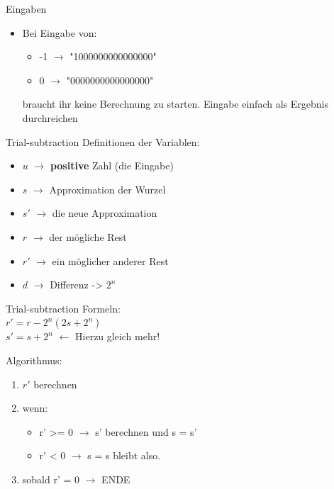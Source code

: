 \documentclass[aspectratio=169,presentation]{beamer}
\begin{document}
\begin{frame} {Eingaben}
	\begin{itemize}
		\item Bei Eingabe von:
		\begin{itemize}
			\item -1 $\rightarrow$ "1000000000000000"
			\item 0 $\rightarrow$ "0000000000000000"
		\end{itemize}
		braucht ihr keine Berechnung zu starten. Eingabe einfach als Ergebnis durchreichen
	\end{itemize}	
\end{frame}


\begin{frame} {Trial-subtraction}
	Definitionen der Variablen:
	\begin{itemize}
		\item $u$ $\rightarrow$ \textbf{positive} Zahl (die Eingabe)
		\item $s$ $\rightarrow$ Approximation der Wurzel
		\item $s'$ $\rightarrow$ die \grqq{}neue\grqq{} Approximation
		\item $r$ $\rightarrow$ der mögliche Rest
		\item $r'$ $\rightarrow$ ein möglicher \grqq{}anderer\grqq{} Rest
		\item $d$ $\rightarrow$ Differenz -> $2^n$
	\end{itemize}
\end{frame}

\begin{frame} {Trial-subtraction}
	Formeln: \\
	$r' = r - 2^n (2s + 2^n)$ \\
	$s' = s + 2^n$ $\leftarrow$ Hierzu gleich mehr!
\end{frame}

\begin{frame}
	Algorithmus:
	\begin{enumerate}
		\item $r'$ berechnen
		\item wenn:
		\begin{itemize}
			\item r' >= 0 $\rightarrow$ s' berechnen und s = s'
			\item r' < 0 $\rightarrow$ s = s bleibt also.
		\end{itemize}
		\item sobald r' = 0 $\rightarrow$ ENDE
	\end{enumerate}
\end{frame}
\end{document}
